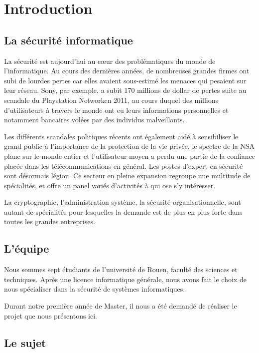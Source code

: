 \chapter{Introduction}

\section{La sécurité informatique}

La sécurité est aujourd'hui au cœur des problématiques du monde de l'informatique. Au cours des dernières années, de nombreuses grandes firmes ont subi de lourdes pertes car elles avaient sous-estimé les menaces qui pesaient sur leur réseau. Sony\textregistered, par exemple, a subit 170 millions de dollar\cite{PSN} de pertes suite au scandale du Playstation Network\texttrademark en 2011, au cours duquel des millions d'utilisateurs à travers le monde ont eu leurs informations personnelles et notamment bancaires volées par des individus malveillants.

 Les différents scandales politiques récents ont également aidé à sensibiliser le grand public à l'importance de la protection de la vie privée, le spectre de la NSA plane sur le monde entier et l'utilisateur moyen a perdu une partie de la confiance placée dans les télécommunications en général. Les postes d'expert en sécurité sont désormais légion. Ce secteur en pleine expansion regroupe une multitude de spécialités, et offre un panel variés d'activités à qui ose s'y intéresser.
 
La cryptographie, l'administration système, la sécurité organisationnelle, sont autant de spécialités pour lesquelles la demande est de plus en plus forte dans toutes les grandes entreprises.

\section{L'équipe}

Nous sommes sept étudiants de l'université de Rouen, faculté des sciences et techniques. Après une licence informatique générale, nous avons fait le choix de nous spécialiser dans la sécurité de systèmes informatiques.

 Durant notre première année de Master, il nous a été demandé de réaliser le projet que nous présentons ici.
 
 
\section{Le sujet}